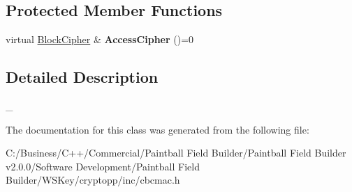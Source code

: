 \subsection*{Protected Member Functions}
\begin{DoxyCompactItemize}
\item 
\hypertarget{class_c_b_c___m_a_c___base_a854a6b1050c106cdb92baf576ae9d966}{
virtual \hyperlink{class_block_cipher}{BlockCipher} \& {\bfseries AccessCipher} ()=0}
\label{class_c_b_c___m_a_c___base_a854a6b1050c106cdb92baf576ae9d966}

\end{DoxyCompactItemize}


\subsection{Detailed Description}
\_\- 

The documentation for this class was generated from the following file:\begin{DoxyCompactItemize}
\item 
C:/Business/C++/Commercial/Paintball Field Builder/Paintball Field Builder v2.0.0/Software Development/Paintball Field Builder/WSKey/cryptopp/inc/cbcmac.h\end{DoxyCompactItemize}
